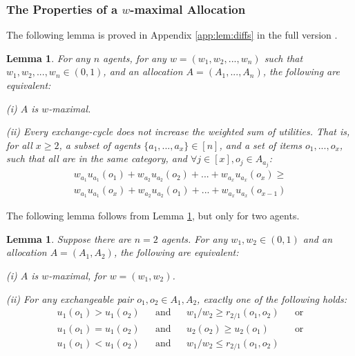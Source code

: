 \documentclass[sigconf]{aamas}
\newtheorem{lemma}[theorem]{Lemma}
\theoremstyle{definition}
\begin{document}
\subsubsection{The Properties of a $w$-maximal Allocation}



The following lemma is proved in Appendix \ref{app:lem:diffs} in the full version \citep{shoshan2022efficient}.

\begin{lemma}
\label{lem:diffs}
For any $n$ agents,
for any $w=(w_1,w_2,...,w_n)$ such that $w_1,w_2,...,w_n\in(0,1)$, and an allocation $A=(A_1,...,A_n)$, the following are equivalent:

(i) $A$ is $w$-maximal.


(ii) Every exchange-cycle does not increase the weighted sum of utilities.
That is, for all $x\geq 2$, a subset of agents $\{a_1,...,a_x\}\in [n]$, and a set of items $o_1,...,o_x$, such that all are in the same category, and $\forall j\in [x], o_j\in A_{a_j}$:
\begin{align*}
    w_{a_1} u_{a_1} (o_1) + w_{a_2} u_{a_2} (o_2) + ... + w_{a_x} u_{a_x} (o_x) \geq \\
    w_{a_1} u_{a_1} (o_x) + w_{a_2} u_{a_2} (o_1) + ... + w_{a_x} u_{a_x} (o_{x-1})
\end{align*}
\end{lemma}



The following lemma follows from Lemma \ref{lem:diffs}, but only for two agents.

\begin{lemma}
\label{lem:diffs2}
Suppose there are $n=2$ agents.
For any $w_1,w_2\in(0,1)$ and an allocation $A=(A_1,A_2)$, the following are equivalent:

(i) $A$ is $w$-maximal, for $w=(w_1,w_2)$.

(ii) For any exchangeable pair $o_1,o_2 \in A_1,A_2$, exactly one of the following holds:
\begin{align*}
u_1(o_1) > u_1(o_2) && \text{and} && 
w_1/w_2 \geq r_{2/1}(o_1,o_2) && \text{or} 
\\
u_1(o_1) = u_1(o_2) && \text{and} && 
u_2(o_2)\geq u_2(o_1) && \text{or} 
\\
u_1(o_1) < u_1(o_2) && \text{and} && 
w_1/w_2 \leq r_{2/1}(o_1,o_2)
\end{align*}
\end{lemma}
\end{document}
